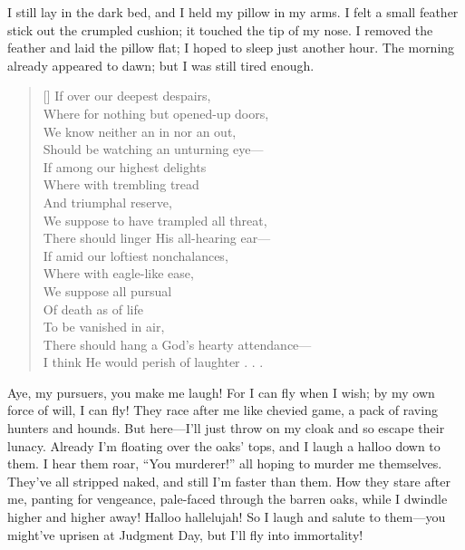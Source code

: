 \documentclass[12pt,a4paper]{article}
\begin{document}
I still lay in the dark bed, and I held my pillow in my arms. I felt a small feather stick out the crumpled cushion; it touched the tip of my nose. I removed the feather and laid the pillow flat; I hoped to sleep just another hour. The morning already appeared to dawn; but I was still tired enough.
\settowidth{\versewidth}{There should hang a God’s hearty attendance—}
\begin{verse}[\versewidth]
If over our deepest despairs, \\
Where for nothing but opened-up doors, \\
We know neither an in nor an out, \\
Should be watching an unturning eye— \\
If among our highest delights \\
Where with trembling tread \\
And triumphal reserve, \\
We suppose to have trampled all threat, \\
There should linger His all-hearing ear— \\
If amid our loftiest nonchalances, \\
Where with eagle-like ease, \\
We suppose all pursual \\
Of death as of life \\
To be vanished in air, \\
There should hang a God’s hearty attendance— \\
I think He would perish of laughter . . .
\end{verse}
\vspace{20pt}\noindent{}\vspace{10pt}

Aye, my pursuers, you make me laugh! For I can fly when I wish; by my own force of will, I can fly! They race after me like chevied game, a pack of raving hunters and hounds. But here—I’ll just throw on my cloak and so escape their lunacy. Already I’m floating over the oaks’ tops, and I laugh a halloo down to them. I hear them roar, “You murderer!” all hoping to murder me themselves. They’ve all stripped naked, and still I’m faster than them. How they stare after me, panting for vengeance, pale-faced through the barren oaks, while I dwindle higher and higher away! Halloo hallelujah! So I laugh and salute to them—you might’ve uprisen at Judgment Day, but I’ll fly into immortality!
\end{document}

